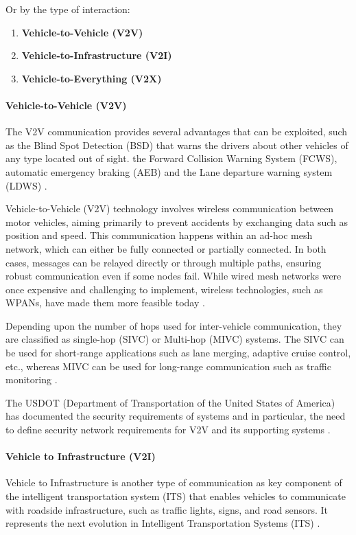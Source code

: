 Or by the type of interaction:
\begin{enumerate}
    \item \textbf{Vehicle-to-Vehicle (V2V)}
    \item \textbf{Vehicle-to-Infrastructure (V2I)}
    \item \textbf{Vehicle-to-Everything (V2X)}
\end{enumerate}

\paragraph{Vehicle-to-Vehicle (V2V)}

The V2V communication provides several advantages that can be exploited, such as the Blind Spot Detection (BSD) that warns the drivers about other vehicles of any type located out of sight.
the Forward Collision Warning System (FCWS), automatic emergency braking (AEB) and the Lane departure warning system (LDWS) \cite{arena2019overview} .

Vehicle-to-Vehicle (V2V) technology involves wireless communication between motor vehicles, aiming primarily to prevent accidents by exchanging data such as position and speed.
This communication happens within an ad-hoc mesh network, which can either be fully connected or partially connected.
In both cases, messages can be relayed directly or through multiple paths, ensuring robust communication even if some nodes fail.
While wired mesh networks were once expensive and challenging to implement, wireless technologies, such as WPANs, have made them more feasible today \cite{arena2019overview} .

Depending upon the number of hops used for inter-vehicle communication, they are classified as single-hop (SIVC) or
Multi-hop (MIVC) systems.
The SIVC can be used for short-range applications such as
lane merging, adaptive cruise control, etc., whereas MIVC can be used for long-range communication such as traffic monitoring \cite{zheng2020cooperative} .

The USDOT (Department of Transportation of the United States of America) has documented the security requirements of
systems and in particular, the need to define security network requirements for V2V and its supporting systems \cite{dot2021v2v} .

\paragraph{Vehicle to Infrastructure (V2I)}
Vehicle to Infrastructure is another type of communication as key component of the intelligent transportation system (ITS)
that enables vehicles to communicate with roadside infrastructure, such as traffic lights, signs, and road sensors.
It represents the next evolution in Intelligent Transportation Systems (ITS) \cite{dot2024v2i}.

